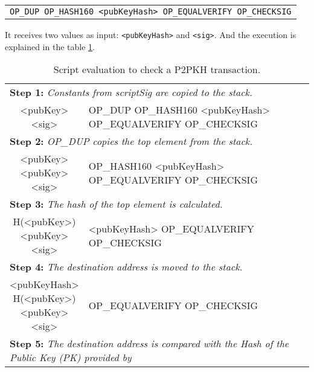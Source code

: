 \begin{center}
	  \begin{tabular}{|c|}
		  \texttt{OP\_DUP OP\_HASH160 <pubKeyHash> OP\_EQUALVERIFY OP\_CHECKSIG}
     \end{tabular}
\end{center}

  It receives two values as input:  \lstinline{<pubKeyHash>} and
  \lstinline{<sig>}. And the execution is explained in the table \ref{tab:p2pkh_exec}.

	\begin{table}[]
		\small
		\caption{Script evaluation to check a P2PKH transaction.}
		\label{tab:p2pkh_exec}
		\begin{tabularx}{\textwidth}{| c | X |}
			\hline
				\thead{Stack} & \thead{Script} \\
			\hline
			\multicolumn{2}{|l|}{\textbf{Step 1: }\textit{Constants from scriptSig are copied to the stack.}} \\
			\hline
			\makecell{<pubKey>\\<sig>} & OP\_DUP \footnotesize{OP\_HASH160 <pubKeyHash> OP\_EQUALVERIFY OP\_CHECKSIG} \\
			\hline
			\multicolumn{2}{|l|}{\textbf{Step 2: }\textit{OP\_DUP copies the top element from the stack.}} \\
			\hline
			\makecell{<pubKey> \\ <pubKey> \\ <sig>} & OP\_HASH160 \footnotesize{<pubKeyHash> OP\_EQUALVERIFY OP\_CHECKSIG} \\
			\hline
			\multicolumn{2}{|l|}{\textbf{Step 3: }\textit{The hash of the top element is calculated.}} \\
			\hline
			\makecell{H(<pubKey>) \\ <pubKey> \\ <sig>} & <pubKeyHash> \footnotesize{OP\_EQUALVERIFY OP\_CHECKSIG} \\
			\hline
			\multicolumn{2}{|l|}{\textbf{Step 4: }\textit{The destination address is moved to the stack.}} \\
			\hline
			\makecell{<pubKeyHash> \\ H(<pubKey>) \\ <pubKey> \\ <sig>} & OP\_EQUALVERIFY \footnotesize{OP\_CHECKSIG} \\
			\hline
			\multicolumn{2}{|l|}{\textbf{Step 5: }\textit{The destination address is compared with the Hash of the Public Key (PK) provided by}} \\

\end{tabularx}
\end{table}
